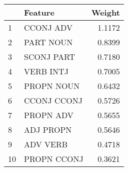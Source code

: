 \begin{tabular}{llr}
\toprule
{} &      Feature &  Weight \\
\midrule
1  &    CCONJ ADV &  1.1172 \\
2  &    PART NOUN &  0.8399 \\
3  &   SCONJ PART &  0.7180 \\
4  &    VERB INTJ &  0.7005 \\
5  &   PROPN NOUN &  0.6432 \\
6  &  CCONJ CCONJ &  0.5726 \\
7  &    PROPN ADV &  0.5655 \\
8  &    ADJ PROPN &  0.5646 \\
9  &     ADV VERB &  0.4718 \\
10 &  PROPN CCONJ &  0.3621 \\
\bottomrule
\end{tabular}
